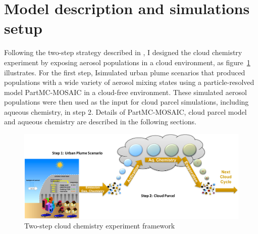 \documentclass[edeposit,fullpage]{uiucthesis2009}
\begin{document}
\section{Model description and simulations setup}
\label{chap2.2}
Following the two-step strategy described in \citet{ching2012impacts}, I designed the cloud chemistry experiment by exposing aerosol populations in a cloud environment, as figure~\ref{chap2-fig1-frame} illustrates. For the first step, Isimulated urban plume scenarios that produced populations with a wide variety of aerosol mixing states using a particle-resolved model PartMC-MOSAIC in a cloud-free environment. These simulated aerosol populations were then used as the input for cloud parcel simulations, including aqueous chemistry, in step 2. Details of PartMC-MOSAIC, cloud parcel model and aqueous chemistry are described in the following sections.

\begin{figure}[ht]
    \centering 
    \includegraphics[scale=0.4]{chap2_figs/chap2-fig1-frame.pdf}
    \caption{Two-step cloud chemistry experiment framework}
    \label{chap2-fig1-frame}
\end{figure}
\end{document}
